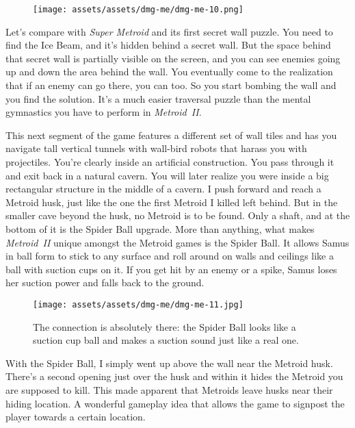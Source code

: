 \documentclass{book}
\begin{document}
\begin{figure}[hbt]
\vskip 10pt
\centering \texttt{[image: assets/assets/dmg-me/dmg-me-10.png]}
\vskip 6pt
\end{figure}

Let’s compare with \emph{Super Metroid} and its first secret wall puzzle. You need to find the Ice Beam, and it’s hidden behind a secret wall. But the space behind that secret wall is partially visible on the screen, and you can see enemies going up and down the area behind the wall. You eventually come to the realization that if an enemy can go there, you can too. So you start bombing the wall and you find the solution. It’s a much easier traversal puzzle than the mental gymnastics you have to perform in \emph{Metroid II}.

This next segment of the game features a different set of wall tiles and has you navigate tall vertical tunnels with wall-bird robots that harass you with projectiles. You’re clearly inside an artificial construction. You pass through it and exit back in a natural cavern. You will later realize you were inside a big rectangular structure in the middle of a cavern. I push forward and reach a Metroid husk, just like the one the first Metroid I killed left behind. But in the smaller cave beyond the husk, no Metroid is to be found. Only a shaft, and at the bottom of it is the Spider Ball upgrade. More than anything, what makes \emph{Metroid II} unique amongst the Metroid games is the Spider Ball. It allows Samus in ball form to stick to any surface and roll around on walls and ceilings like a ball with suction cups on it. If you get hit by an enemy or a spike, Samus loses her suction power and falls back to the ground.

\begin{figure}[hbt]
\vskip 10pt
\centering \texttt{[image: assets/assets/dmg-me/dmg-me-11.jpg]}\par\pagetwodescription The connection is absolutely there: the Spider Ball looks like a suction cup ball and makes a suction sound just like a real one.
\vskip 6pt
\end{figure}

With the Spider Ball, I simply went up above the wall near the Metroid husk. There’s a second opening just over the husk and within it hides the Metroid you are supposed to kill. This made apparent that Metroids leave husks near their hiding location. A wonderful gameplay idea that allows the game to signpost the player towards a certain location.
\end{document}
